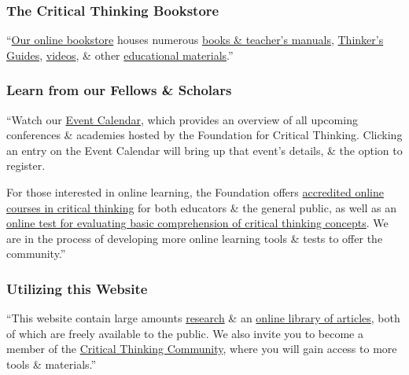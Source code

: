 \documentclass[oneside]{book}
\numberwithin{equation}{section}
\begin{document}
\subsubsection{The Critical Thinking Bookstore}
``\href{https://www.criticalthinking.org/bookstore/index.cfm}{Our online bookstore} houses numerous \href{https://www.criticalthinking.org/store/catalogs/books/214}{books \& teacher's manuals}, \href{https://www.criticalthinking.org/store/catalogs/thinkers-guides/224}{Thinker's Guides}, \href{https://www.criticalthinking.org/store/catalogs/videos/215}{videos}, \& other \href{https://www.criticalthinking.org/store/catalogs/materials/217}{educational materials}.''

\subsubsection{Learn from our Fellows \& Scholars}
``Watch our \href{https://www.criticalthinking.org/conference/index.cfm}{Event Calendar}, which provides an overview of all upcoming conferences \& academies hosted by the Foundation for Critical Thinking. Clicking an entry on the Event Calendar will bring up that event's details, \& the option to register.

For those interested in online learning, the Foundation offers \href{https://www.criticalthinking.org/pages/online-courses-for-instructors/574/}{accredited online courses in critical thinking} for both educators \& the general public, as well as an \href{https://www.criticalthinking.org/pages/online-critical-thinking-basic-concepts-test/679}{online test for evaluating basic comprehension of critical thinking concepts}. We are in the process of developing more online learning tools \& tests to offer the community.''

\subsubsection{Utilizing this Website}
``This website contain large amounts \href{https://www.criticalthinking.org/research/index.cfm}{research} \& an \href{https://www.criticalthinking.org/pages/index-of-articles/1021/}{online library of articles}, both of which are freely available to the public. We also invite you to become a member of the \href{https://www.criticalthinking.org/courses/OL_CT_Membership.cfm}{Critical Thinking Community}, where you will gain access to more tools \& materials.''

\end{document}
